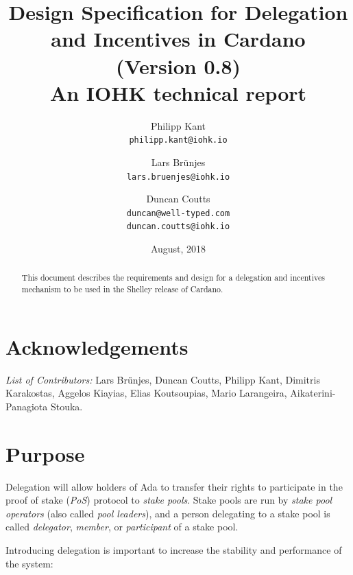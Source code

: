 \documentclass[11pt,a4paper]{article}
\begin{document}
\title{Design Specification for Delegation and Incentives in Cardano \\
       {\small (Version 0.8)} \\
       {\large \sc An IOHK technical report}}

\author{Philipp Kant   \\ {\small \texttt{philipp.kant@iohk.io}} \\
   \and Lars Br\"unjes \\ {\small \texttt{lars.bruenjes@iohk.io}} \\
   \and Duncan Coutts  \\ {\small \texttt{duncan@well-typed.com}} \\
                          {\small \texttt{duncan.coutts@iohk.io}}}
\date{August, 2018}

\maketitle

\begin{abstract}
This document describes the requirements and design for a delegation and
incentives mechanism to be used in the Shelley release of Cardano.
\end{abstract}

\tableofcontents
\listoffigures
\listoftodos

\section*{Acknowledgements}\label{acknowledgements}

\emph{List of Contributors:} Lars Br\"unjes, Duncan Coutts, Philipp Kant,
Dimitris Karakostas, Aggelos Kiayias, Elias Koutsoupias, Mario
Larangeira, Aikaterini-Panagiota Stouka.

\section{Purpose}\label{purpose}

Delegation will allow holders of Ada to transfer their rights to
participate in the proof of stake (\emph{PoS}) protocol to \emph{stake
pools}. Stake pools are run by \emph{stake pool operators} (also called
\emph{pool leaders}), and a person delegating to a stake pool is called
\emph{delegator}, \emph{member}, or \emph{participant} of a stake pool.

Introducing delegation is important to increase the stability and
performance of the system:
\end{document}
